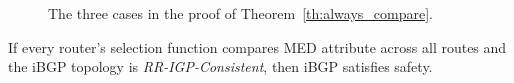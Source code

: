 \begin{figure}
\begin{center}
\begin{psfrags}
\end{psfrags}
\end{center}
\caption[The three cases in the proof of
  Theorem~\ref{th:always_compare}.]{The three cases in the proof of
  Theorem~\ref{th:always_compare}.}
\label{fig:always_compare}
\end{figure}



\begin{theorem}\label{th:always_compare}
If every router's selection function compares MED attribute across all
routes and the iBGP topology is {\em RR-IGP-Consistent}, then iBGP
satisfies safety.
\end{theorem}

